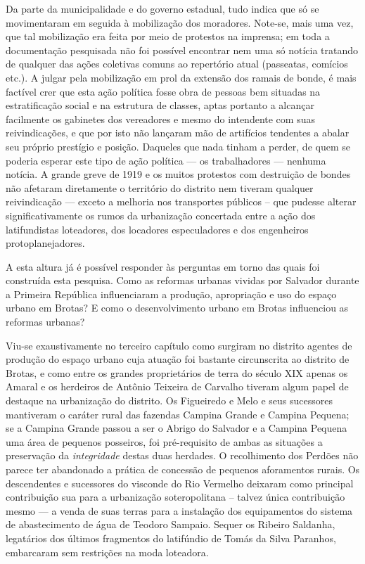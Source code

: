 Da parte da municipalidade e do governo estadual, tudo indica que só se movimentaram em seguida à mobilização dos moradores. Note-se, mais uma vez, que tal mobilização era feita por meio de protestos na imprensa; em toda a documentação pesquisada não foi possível encontrar nem uma só notícia tratando de qualquer das ações coletivas comuns ao repertório atual (passeatas, comícios etc.). A julgar pela mobilização em prol da extensão dos ramais de bonde, é mais factível crer que esta ação política fosse obra de pessoas bem situadas na estratificação social e na estrutura de classes, aptas portanto a alcançar facilmente os gabinetes dos vereadores e mesmo do intendente com suas reivindicações, e que por isto não lançaram mão de artifícios tendentes a abalar seu próprio prestígio e posição. Daqueles que nada tinham a perder, de quem se poderia esperar este tipo de ação política --- os trabalhadores --- nenhuma notícia. A grande greve de 1919 e os muitos protestos com destruição de bondes não afetaram diretamente o território do distrito nem tiveram qualquer reivindicação --- exceto a melhoria nos transportes públicos -- que pudesse alterar significativamente os rumos da urbanização concertada entre a ação dos latifundistas loteadores, dos locadores especuladores e dos engenheiros protoplanejadores.

A esta altura já é possível responder às perguntas em torno das quais foi construída esta pesquisa. Como as reformas urbanas vividas por Salvador durante a Primeira República influenciaram a produção, apropriação e uso do espaço urbano em Brotas? E como o desenvolvimento urbano em Brotas influenciou as reformas urbanas?

Viu-se exaustivamente no terceiro capítulo como surgiram no distrito agentes de produção do espaço urbano cuja atuação foi bastante circunscrita ao distrito de Brotas, e como entre os grandes proprietários de terra do século XIX apenas os Amaral e os herdeiros de Antônio Teixeira de Carvalho tiveram algum papel de destaque na urbanização do distrito. Os Figueiredo e Melo e seus sucessores mantiveram o caráter rural das fazendas Campina Grande e Campina Pequena; se a Campina Grande passou a ser o Abrigo do Salvador e a Campina Pequena uma área de pequenos posseiros, foi pré-requisito de ambas as situações a preservação da \textit{integridade} destas duas herdades. O recolhimento dos Perdões não parece ter abandonado a prática de concessão de pequenos aforamentos rurais. Os descendentes e sucessores do visconde do Rio Vermelho deixaram como principal contribuição sua para a urbanização soteropolitana -- talvez única contribuição mesmo --- a venda de suas terras para a instalação dos equipamentos do sistema de abastecimento de água de Teodoro Sampaio. Sequer os Ribeiro Saldanha, legatários dos últimos fragmentos do latifúndio de Tomás da Silva Paranhos, embarcaram sem restrições na moda loteadora. 

